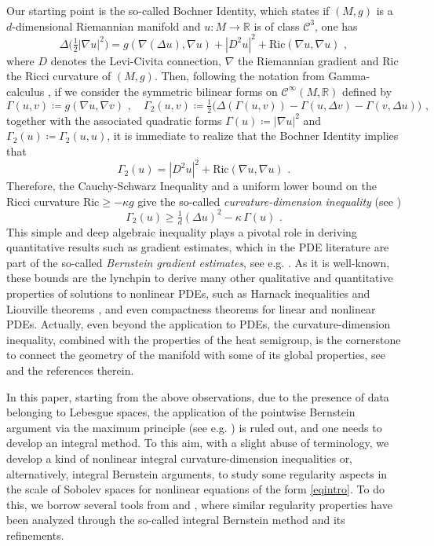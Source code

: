 \documentclass[10pt, a4paper, reqno, oneside]{amsart}
\theoremstyle{plain}
\theoremstyle{definition}
\theoremstyle{plain}
\theoremstyle{definition}
\theoremstyle{plain}
\renewcommand{\=}{:=}
\begin{document}
Our starting point is the so-called Bochner Identity, which states if $(M,g)$ is a $d$-dimensional Riemannian manifold and $u: M \to \mathbb{R}$ is of class $\mathcal{C}^3$, one has
$$
\Delta\big(\tfrac12|\nabla u|^2\big) = g(\nabla(\Delta u),\nabla u) + |D^2u|^2 + \mathrm{Ric}(\nabla u,\nabla u) \,\, ,
$$
where $D$ denotes the Levi-Civita connection, $\nabla$ the Riemannian gradient and $\mathrm{Ric}$ the Ricci curvature of $(M,g)$. Then, following the notation from Gamma-calculus \cite{BGL}, if we consider the symmetric bilinear forms on $\mathcal{C}^{\infty}(M,\mathbb{R})$ defined by
$$
\Gamma(u,v) \coloneqq g(\nabla u, \nabla v) \,\, , \quad
\Gamma_2(u,v) \coloneqq \tfrac12 \big(\Delta(\Gamma(u,v))-\Gamma(u,\Delta v)-\Gamma(v,\Delta u)\big) \,\, ,
$$
together with the associated quadratic forms $\Gamma(u) \coloneqq |\nabla u|^2$ and $\Gamma_2(u) \coloneqq \Gamma_2(u,u)$, it is immediate to realize that the Bochner Identity implies that
$$
\Gamma_2(u) = |D^2u|^2 +\mathrm{Ric}(\nabla u,\nabla u) \,\, .
$$
Therefore, the Cauchy-Schwarz Inequality and a uniform lower bound on the Ricci curvature $\mathrm{Ric} \geq -\kappa g$ give the so-called {\it curvature-dimension inequality} (see \cite{BGL})
\begin{equation}\label{cdineq}
\Gamma_2(u) \geq \tfrac1d (\Delta u)^2 -\kappa\,\Gamma(u) \,\, .
\end{equation}
This simple and deep algebraic inequality plays a pivotal role in deriving quantitative results such as gradient estimates, which in the PDE literature are part of the so-called {\it Bernstein gradient estimates}, see e.g. \cite{ll, Lions85, VeronBook, VeronJFA, CGell}. As it is well-known, these bounds are the lynchpin to derive many other qualitative and quantitative properties of solutions to nonlinear PDEs, such as Harnack inequalities and Liouville theorems \cite{SerrinPeletier,ColdingMinicozzi}, and even compactness theorems for linear and nonlinear PDEs. Actually, even beyond the application to PDEs, the curvature-dimension inequality, combined with the properties of the heat semigroup, is the cornerstone to connect the geometry of the manifold with some of its global properties, see \cite{GarofaloFrac,BaudoinGarofalo} and the references therein. \smallskip

In this paper, starting from the above observations, due to the presence of data belonging to Lebesgue spaces, the application of the pointwise Bernstein argument via the maximum principle (see e.g. \cite{PorLeo}) is ruled out, and one needs to develop an integral method. To this aim, with a slight abuse of terminology, we develop a kind of nonlinear integral curvature-dimension inequalities or, alternatively, integral Bernstein arguments, to study some regularity aspects in the scale of Sobolev spaces for nonlinear equations of the form \eqref{eqintro}. To do this, we borrow several tools from \cite{Lions85,ll,BardiPerthame} and \cite{CGell}, where similar regularity properties have been analyzed through the so-called integral Bernstein method and its refinements.
\end{document}
